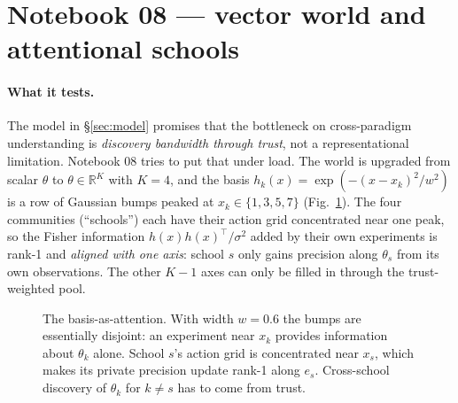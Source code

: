 \documentclass[11pt,a4paper]{article}
\theoremstyle{plain}
\begin{document}
\section{Notebook 08 --- vector world and attentional schools}
\label{sec:nb08}

\paragraph{What it tests.} The model in §\ref{sec:model} promises that
the bottleneck on cross-paradigm understanding is \emph{discovery
bandwidth through trust}, not a representational limitation. Notebook 08
tries to put that under load. The world is upgraded from scalar
$\theta$ to $\theta\in\mathbb{R}^K$ with $K=4$, and the basis
$h_k(x)=\exp(-(x-x_k)^2/w^2)$ is a row of Gaussian bumps peaked at
$x_k\in\{1,3,5,7\}$ (Fig.~\ref{fig:bumps}). The four communities
(``schools'') each have their action grid concentrated near one peak,
so the Fisher information $h(x)h(x)^\top/\sigma^2$ added by their own
experiments is rank-1 and \emph{aligned with one axis}: school $s$ only
gains precision along $\theta_s$ from its own observations. The other
$K-1$ axes can only be filled in through the trust-weighted pool.

\begin{figure}[h]
\centering
{}
\caption{The basis-as-attention. With width $w=0.6$ the bumps are
essentially disjoint: an experiment near $x_k$ provides information
about $\theta_k$ alone. School $s$'s action grid is concentrated near
$x_s$, which makes its private precision update rank-1 along $e_s$.
Cross-school discovery of $\theta_k$ for $k\neq s$ has to come from
trust.}
\label{fig:bumps}
\end{figure}
\end{document}
